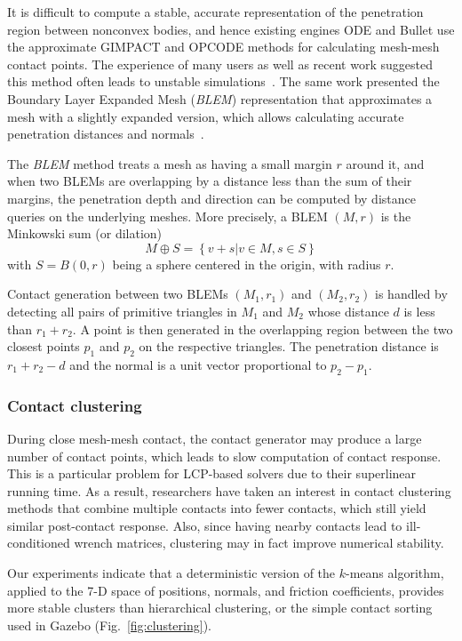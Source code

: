 It is difficult to compute a stable, accurate representation of the penetration region between nonconvex bodies, and hence existing engines ODE and Bullet use the approximate GIMPACT and OPCODE methods for calculating mesh-mesh contact points. The experience of many users as well as recent work suggested this method often leads to unstable simulations~\cite{Hauser13BLEM}. The same work presented the Boundary Layer Expanded Mesh (\emph{BLEM}) representation that approximates a mesh with a slightly expanded version, which allows calculating accurate penetration distances and normals~\cite{Hauser13BLEM}. 

The \emph{BLEM} method treats a mesh as having a small margin $r$ around it, and when two BLEMs are overlapping by a distance less than the sum of their margins, the penetration depth and direction can be computed by distance queries on the underlying meshes.  More precisely, a BLEM $(M,r)$ is the Minkowski sum (or dilation) 
\begin{equation}
M \oplus S=\left\{v+s|v \in M,s \in S\right\}
\end{equation}
with $S=B(0,r)$ being a sphere centered in the origin, with radius $r$.

Contact generation between two BLEMs $(M_1,r_1)$ and $(M_2,r_2)$ is handled by detecting all pairs of primitive triangles in $M_1$ and $M_2$ whose distance $d$ is less than $r_1+r_2$.  A point is then generated in the overlapping region between the two closest points $p_1$ and $p_2$ on the respective triangles.  The penetration distance is $r_1+r_2-d$ and the normal is a unit vector proportional to $p_2-p_1$.


\subsubsection{Contact clustering}

During close mesh-mesh contact, the contact generator may produce a large number of contact points, which leads to slow computation of contact response. This is a particular problem for LCP-based solvers due to their superlinear running time.  As a result, researchers have taken an interest in contact clustering methods that combine multiple contacts into fewer contacts, which still yield similar post-contact response.  Also, since having nearby contacts lead to ill-conditioned wrench matrices, clustering may in fact improve numerical stability. 

Our experiments indicate that a deterministic version of the $k$-means algorithm, applied to the 7-D space of positions, normals, and friction coefficients, provides more stable clusters than hierarchical clustering, or the simple contact sorting used in Gazebo (Fig.~\ref{fig:clustering}).

